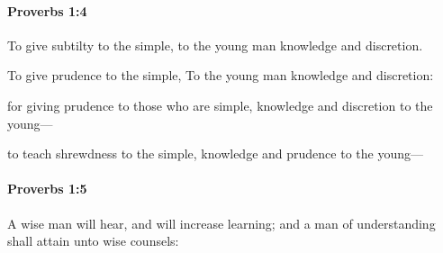		\paragraph{Proverbs 1:4} %
			\label{PROVERBS-1-4}

			To give subtilty to the simple, to the young man knowledge and discretion.

			\begin{versebox}
					\item[BHS] 
					\item[ASV] To give prudence to the simple, To the young man knowledge and discretion:
					\item[NIV] for giving prudence to those who are simple, knowledge and discretion to the young—
					\item[NRSV] to teach shrewdness to the simple, knowledge and prudence to the young—
			\end{versebox}

		\paragraph{Proverbs 1:5} %
			\label{PROVERBS-1-5}

			A wise man will hear, and will increase learning; and a man of understanding shall attain unto wise counsels:

